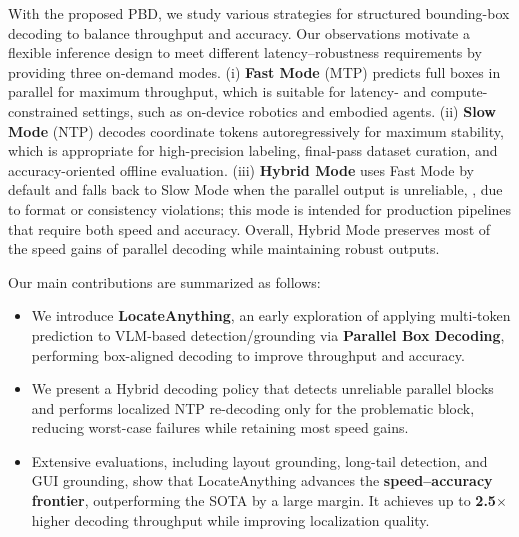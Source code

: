 With the proposed PBD, we study various strategies for structured bounding-box decoding to balance throughput and accuracy. Our observations motivate a  flexible inference design to meet different latency--robustness requirements by providing three on-demand modes. (i) \textbf{Fast Mode} (MTP) predicts full boxes in parallel for maximum throughput, which is suitable for latency- and compute-constrained settings, such as on-device robotics and embodied agents. (ii) \textbf{Slow Mode} (NTP) decodes coordinate tokens autoregressively for maximum stability, which is appropriate for high-precision labeling, final-pass dataset curation, and accuracy-oriented offline evaluation. (iii) \textbf{Hybrid Mode} uses Fast Mode by default and falls back to Slow Mode when the parallel output is unreliable, \eg, due to format or consistency violations; this mode is intended for production pipelines that require both speed and accuracy. Overall, Hybrid Mode preserves most of the speed gains of parallel decoding while maintaining robust outputs.

\vspace{+1mm}
Our main contributions are summarized as follows:
\vspace{-2mm}
\begin{itemize}
\item We introduce \textbf{LocateAnything}, an early exploration of applying multi-token prediction to VLM-based detection/grounding via \textbf{Parallel Box Decoding}, performing box-aligned decoding to improve throughput and accuracy.
\item We present a Hybrid decoding policy that detects unreliable parallel blocks and performs localized NTP re-decoding only for the problematic block, reducing worst-case failures while retaining most speed gains.
\item Extensive evaluations, including layout grounding, long-tail detection, and GUI grounding, show that LocateAnything advances the \textbf{speed--accuracy frontier}, outperforming the SOTA by a large margin. It achieves up to \textbf{2.5$\times$} higher decoding throughput while improving localization quality.
\end{itemize}
\vspace{-2mm}
